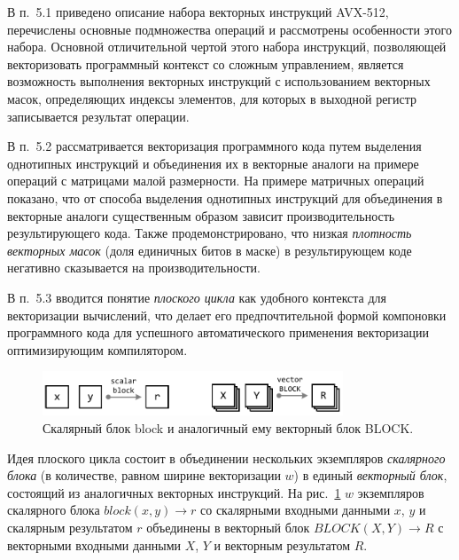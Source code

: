 \documentclass[a4paper,14pt]{extarticle}                     %
\theoremstyle{plain}                                         %
\begin{document}

В п.~5.1 приведено описание набора векторных инструкций AVX-512, перечислены основные подмножества операций и рассмотрены особенности этого набора.
Основной отличительной чертой этого набора инструкций, позволяющей векторизовать программный контекст со сложным управлением, является возможность выполнения векторных инструкций с использованием векторных масок, определяющих индексы элементов, для которых в выходной регистр записывается результат операции.


В п.~5.2 рассматривается векторизация программного кода путем выделения однотипных инструкций и объединения их в векторные аналоги на примере операций с матрицами малой размерности.
На примере матричных операций показано, что от способа выделения однотипных инструкций для объединения в векторные аналоги существенным образом зависит производительность результирующего кода.
Также продемонстрировано, что низкая \textit{плотность векторных масок} (доля единичных битов в маске) в результирующем коде негативно сказывается на производительности.


В п.~5.3 вводится понятие \textit{плоского цикла} как удобного контекста для векторизации вычислений, что делает его предпочтительной формой компоновки программного кода для успешного автоматического применения векторизации оптимизирующим компилятором.

\begin{figure}[ht]
\centering
\includegraphics[width=0.8\textwidth]{./fig/vec_block_BLOCK.pdf}
\singlespacing
\caption{Скалярный блок block и аналогичный ему векторный блок BLOCK.}
\label{fig:vec_block_BLOCK}
\end{figure}

Идея плоского цикла состоит в объединении нескольких экземпляров \textit{скалярного блока} (в количестве, равном ширине векторизации $w$) в единый \textit{векторный блок}, состоящий из аналогичных векторных инструкций.
На рис.~\ref{fig:vec_block_BLOCK} $w$ экземпляров скалярного блока $block(x, y) \rightarrow r$ со скалярными входными данными $x$, $y$ и скалярным результатом $r$ объединены в векторный блок $BLOCK(X, Y) \rightarrow R$ с векторными входными данными $X$, $Y$ и векторным результатом $R$.
\end{document}
